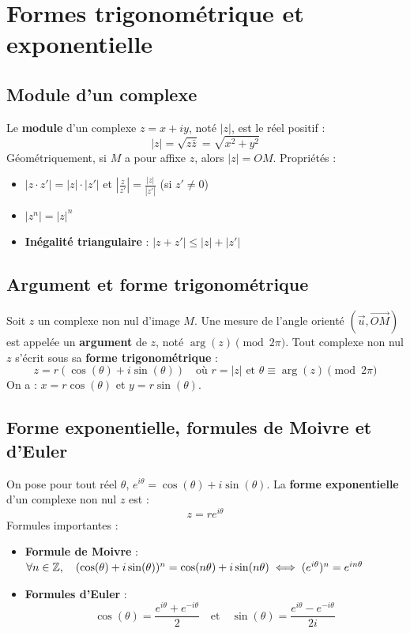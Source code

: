 \documentclass{article}
\begin{document}
	\section{Formes trigonométrique et exponentielle}
	
	\subsection{Module d'un complexe}
	Le \textbf{module} d'un complexe $z = x + iy$, noté $|z|$, est le réel positif :
	\[ |z| = \sqrt{z\bar{z}} = \sqrt{x^2 + y^2} \]
	Géométriquement, si $M$ a pour affixe $z$, alors $|z| = OM$.
	Propriétés :
	\begin{itemize}
		\item $|z \cdot z'| = |z| \cdot |z'|$ et $\left|\frac{z}{z'}\right| = \frac{|z|}{|z'|}$ (si $z' \ne 0$)
		\item $|z^n| = |z|^n$
		\item \textbf{Inégalité triangulaire} : $|z + z'| \le |z| + |z'|$
	\end{itemize}
	
	\subsection{Argument et forme trigonométrique}
	Soit $z$ un complexe non nul d'image $M$. Une mesure de l'angle orienté $(\vec{u}, \overrightarrow{OM})$ est appelée un \textbf{argument} de $z$, noté $\arg(z) \pmod{2\pi}$.
	Tout complexe non nul $z$ s'écrit sous sa \textbf{forme trigonométrique} :
	\[ z = r(\cos(\theta) + i\sin(\theta)) \quad \text{où } r = |z| \text{ et } \theta \equiv \arg(z) \pmod{2\pi} \]
	On a : $x = r\cos(\theta)$ et $y = r\sin(\theta)$.
	
	\subsection{Forme exponentielle, formules de Moivre et d'Euler}
	On pose pour tout réel $\theta$, $e^{i\theta} = \cos(\theta) + i\sin(\theta)$.
	La \textbf{forme exponentielle} d'un complexe non nul $z$ est :
	\[ z = r e^{i\theta} \]
	Formules importantes :
	\begin{itemize}
		\item \textbf{Formule de Moivre} : $\qcq{n}{Z}, \quad (\cos(\theta) + i\sin(\theta))^n = \cos(n\theta) + i\sin(n\theta) \iff (e^{i\theta})^n = e^{in\theta}$
		\item \textbf{Formules d'Euler} :
		\[ \cos(\theta) = \frac{e^{i\theta} + e^{-i\theta}}{2} \quad \text{et} \quad \sin(\theta) = \frac{e^{i\theta} - e^{-i\theta}}{2i} \]
	\end{itemize}
	
\end{document}
